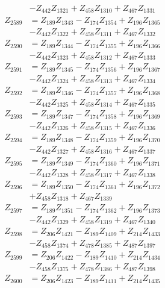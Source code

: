 \begin{multicols}{2}
\begin{align}
&- Z_{442}Z_{1321} + Z_{458}Z_{1310} + Z_{467}Z_{1331} \nonumber \\
Z_{2589} &= Z_{189}Z_{1343} - Z_{174}Z_{1354} + Z_{196}Z_{1365}  \nonumber \\
&- Z_{442}Z_{1322} + Z_{458}Z_{1311} + Z_{467}Z_{1332} \nonumber \\
Z_{2590} &= Z_{189}Z_{1344} - Z_{174}Z_{1355} + Z_{196}Z_{1366}  \nonumber \\
&- Z_{442}Z_{1323} + Z_{458}Z_{1312} + Z_{467}Z_{1333} \nonumber \\
Z_{2591} &= Z_{189}Z_{1345} - Z_{174}Z_{1356} + Z_{196}Z_{1367}  \nonumber \\
&- Z_{442}Z_{1324} + Z_{458}Z_{1313} + Z_{467}Z_{1334} \nonumber \\
Z_{2592} &= Z_{189}Z_{1346} - Z_{174}Z_{1357} + Z_{196}Z_{1368}  \nonumber \\
&- Z_{442}Z_{1325} + Z_{458}Z_{1314} + Z_{467}Z_{1335} \nonumber \\
Z_{2593} &= Z_{189}Z_{1347} - Z_{174}Z_{1358} + Z_{196}Z_{1369}  \nonumber \\
&- Z_{442}Z_{1326} + Z_{458}Z_{1315} + Z_{467}Z_{1336} \nonumber \\
Z_{2594} &= Z_{189}Z_{1348} - Z_{174}Z_{1359} + Z_{196}Z_{1370}  \nonumber \\
&- Z_{442}Z_{1327} + Z_{458}Z_{1316} + Z_{467}Z_{1337} \nonumber \\
Z_{2595} &= Z_{189}Z_{1349} - Z_{174}Z_{1360} + Z_{196}Z_{1371}  \nonumber \\
&- Z_{442}Z_{1328} + Z_{458}Z_{1317} + Z_{467}Z_{1338} \nonumber \\
Z_{2596} &= Z_{189}Z_{1350} - Z_{174}Z_{1361} + Z_{196}Z_{1372}  \nonumber \\
&+ Z_{458}Z_{1318} + Z_{467}Z_{1339} \nonumber \\
Z_{2597} &= Z_{189}Z_{1351} - Z_{174}Z_{1362} + Z_{196}Z_{1373}  \nonumber \\
&- Z_{442}Z_{1329} + Z_{458}Z_{1319} + Z_{467}Z_{1340} \nonumber \\
Z_{2598} &= Z_{206}Z_{1421} - Z_{189}Z_{1409} + Z_{214}Z_{1433}  \nonumber \\
&- Z_{458}Z_{1374} + Z_{478}Z_{1385} + Z_{487}Z_{1397} \nonumber \\
Z_{2599} &= Z_{206}Z_{1422} - Z_{189}Z_{1410} + Z_{214}Z_{1434}  \nonumber \\
&- Z_{458}Z_{1375} + Z_{478}Z_{1386} + Z_{487}Z_{1398} \nonumber \\
Z_{2600} &= Z_{206}Z_{1423} - Z_{189}Z_{1411} + Z_{214}Z_{1435}  \nonumber \\

\end{align}
\end{multicols}
